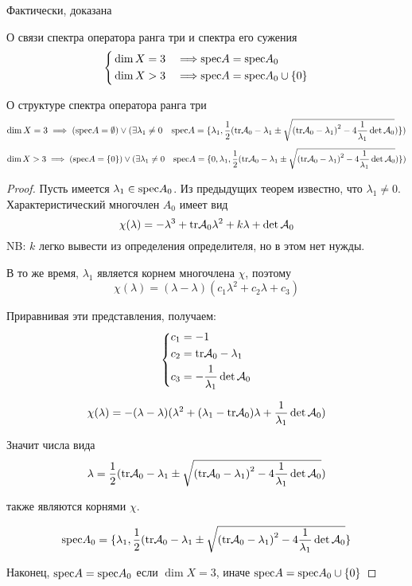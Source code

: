 Фактически, доказана
\begin{thm}{О связи спектра оператора ранга три и спектра его сужения}
  \begin{equation*}
    \left\{\begin{aligned}
      & \dim X = 3 & \implies & \mathrm{spec} A = \mathrm{spec} A_0 \\
      & \dim X > 3 & \implies & \mathrm{spec} A = \mathrm{spec} A_0 \cup \{0\}
    \end{aligned}\right.\end{equation*}
\end{thm}

\begin{thm}{О структуре спектра оператора ранга три}\*
  \label{thm:specstr}
  $$
  \dim X = 3 \implies
  (\mathrm{spec} A = \emptyset)
  \lor (\exists \lambda_1 \neq 0 \quad
  \mathrm{spec} A = \{\lambda_1,
    \frac{1}{2} (\mathrm{tr}\mathcal A_0 - \lambda_1
    \pm\sqrt{ {(\mathrm{tr}\mathcal A_0 - \lambda_1)}^2 - 4\frac{1}{\lambda_1} \det\mathcal A_0 })
  \})$$
  $$
  \dim X > 3 \implies
  (\mathrm{spec} A = \{0\})
  \lor (\exists \lambda_1 \neq 0 \quad
  \mathrm{spec} A = \{0, \lambda_1,
    \frac{1}{2} (\mathrm{tr}\mathcal A_0 - \lambda_1
    \pm\sqrt{ {(\mathrm{tr}\mathcal A_0 - \lambda_1)}^2 - 4\frac{1}{\lambda_1} \det\mathcal A_0 })
  \})$$
\end{thm}
\begin{proof}
  Пусть имеется $\lambda_1\in\mathrm{spec} A_0$.
  Из предыдущих теорем известно, что $\lambda_1\neq 0$.
  Характеристический многочлен $A_0$ имеет вид
  $$\chi(\lambda) = -\lambda^3 + \mathrm{tr}\mathcal A_0 \lambda^2 + k\lambda + \det\mathcal A_0$$
  NB: $k$ легко вывести из определения определителя, но в этом нет нужды.

  В то же время, $\lambda_1$ является корнем многочлена $\chi$, поэтому
  $$\chi(\lambda) = (\lambda - \lambda)(c_1 \lambda^2 + c_2 \lambda + c_3)$$

  Приравнивая эти представления, получаем:
  $$\left\{\begin{aligned}
    & c_1 = -1 \\
    & c_2 = \mathrm{tr}\mathcal A_0 - \lambda_1 \\
    & c_3 = - \frac{1}{\lambda_1} \det\mathcal A_0
  \end{aligned}\right.$$

  $$\chi(\lambda) = -(\lambda - \lambda)(\lambda^2 + (\lambda_1 - \mathrm{tr}\mathcal A_0) \lambda + \frac{1}{\lambda_1}\det\mathcal A_0)$$

  Значит числа вида
  $$\lambda =
  \frac{1}{2} (\mathrm{tr}\mathcal A_0 - \lambda_1
  \pm\sqrt{ {(\mathrm{tr}\mathcal A_0 - \lambda_1)}^2 - 4\frac{1}{\lambda_1} \det\mathcal A_0 }) $$

  также являются корнями $\chi$.

  $$\mathrm{spec} A_0 = \{\lambda_1,
    \frac{1}{2} (\mathrm{tr}\mathcal A_0 - \lambda_1
    \pm\sqrt{ {(\mathrm{tr}\mathcal A_0 - \lambda_1)}^2 - 4\frac{1}{\lambda_1} \det\mathcal A_0 }
  \}$$

  Наконец, $\mathrm{spec} A = \mathrm{spec} A_0$ если $\dim X = 3$, иначе $\mathrm{spec} A = \mathrm{spec} A_0 \cup \{ 0 \}$
\end{proof}


